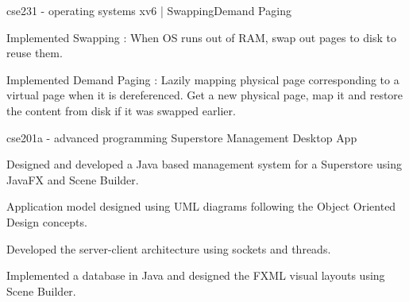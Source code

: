 \begin{cventries}
  \cventry
    {cse231 - operating systems} %
    {xv6 | Swapping{\hspace{0.2em}\cdotp\hspace{0.2em}}Demand Paging} %
    {} %
    {} %
    {
      \begin{cvitems}
        \item {Implemented Swapping : When OS runs out of RAM, swap out pages to disk to reuse them.}
        \item {Implemented Demand Paging : Lazily mapping physical page corresponding to a virtual page when it is dereferenced. Get a new physical page, map it and restore the content from disk if it was swapped earlier.}
      \end{cvitems}
    }
    {}

  \cventry
    {cse201a - advanced programming} %
    {Superstore Management Desktop App} %
    {} %
    {} %
    {
      \begin{cvitems}
        \item {Designed and developed a Java based management system for a Superstore using JavaFX and Scene Builder.}
        \item {Application model designed using UML diagrams following the Object Oriented Design concepts.}
        \item {Developed the server-client architecture using sockets and threads.}
        \item {Implemented a database in Java and designed the FXML visual layouts using Scene Builder.}
      \end{cvitems}
    }
    {}


\end{cventries}